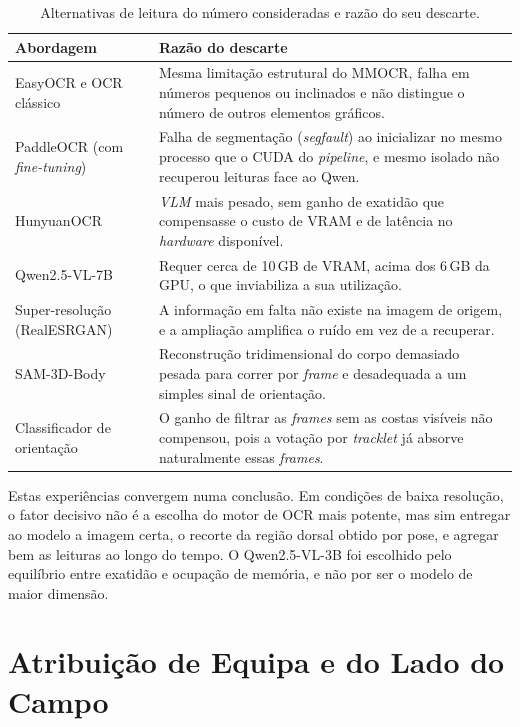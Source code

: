 \begin{table}[htbp]
\centering
\caption{Alternativas de leitura do número consideradas e razão do seu descarte.}
\label{tab:alternativas}
\renewcommand{\arraystretch}{1.35}
\setlength{\tabcolsep}{6pt}
\begin{tabular}{|p{3.6cm}|p{9.0cm}|}
\hline
\textbf{Abordagem} & \textbf{Razão do descarte} \\
\hline
EasyOCR e OCR clássico &
Mesma limitação estrutural do MMOCR, falha em números pequenos ou inclinados e não
distingue o número de outros elementos gráficos. \\
\hline
PaddleOCR (com \emph{fine-tuning}) &
Falha de segmentação (\emph{segfault}) ao inicializar no mesmo processo que o CUDA do
\emph{pipeline}, e mesmo isolado não recuperou leituras face ao Qwen. \\
\hline
HunyuanOCR &
\emph{VLM} mais pesado, sem ganho de exatidão que compensasse o custo de VRAM e de
latência no \emph{hardware} disponível. \\
\hline
Qwen2.5-VL-7B &
Requer cerca de 10\,GB de VRAM, acima dos 6\,GB da GPU, o que inviabiliza a sua
utilização. \\
\hline
Super-resolução (RealESRGAN) &
A informação em falta não existe na imagem de origem, e a ampliação amplifica o ruído
em vez de a recuperar. \\
\hline
SAM-3D-Body &
Reconstrução tridimensional do corpo demasiado pesada para correr por \emph{frame} e
desadequada a um simples sinal de orientação. \\
\hline
Classificador de orientação &
O ganho de filtrar as \emph{frames} sem as costas visíveis não compensou, pois a votação
por \emph{tracklet} já absorve naturalmente essas \emph{frames}. \\
\hline
\end{tabular}
\end{table}


Estas experiências convergem numa conclusão. Em condições de baixa resolução, o fator decisivo não é
a escolha do motor de OCR mais potente, mas sim entregar ao modelo a imagem certa, o recorte da
região dorsal obtido por pose, e agregar bem as leituras ao longo do tempo. O Qwen2.5-VL-3B foi
escolhido pelo equilíbrio entre exatidão e ocupação de memória, e não por ser o modelo de maior
dimensão.

\section{Atribuição de Equipa e do Lado do Campo}

